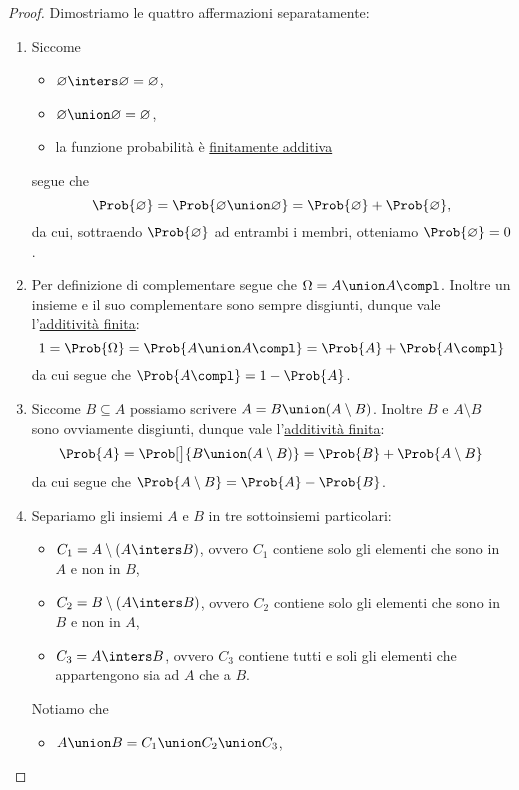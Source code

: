 \begin{proof}
    Dimostriamo le quattro affermazioni separatamente: \begin{enumerate}
        \item Siccome \begin{itemize}
            \item $\varnothing \inters \varnothing = \varnothing$,
            \item $\varnothing \union \varnothing = \varnothing$,
            \item la funzione probabilità è \hyperref[def:prob_finit_add]{finitamente additiva}
        \end{itemize} segue che \[
            \Prob{\varnothing} = \Prob{\varnothing \union \varnothing} = \Prob{\varnothing} + \Prob{\varnothing}, 
        \] da cui, sottraendo $\Prob{\varnothing}$ ad entrambi i membri, otteniamo $\Prob{\varnothing} = 0$.
        \item Per definizione di complementare segue che $\Omega = A \union A\compl$. Inoltre un insieme e il suo complementare sono sempre disgiunti, dunque vale l'\hyperref[def:prob_finit_add]{additività finita}: \[
            1 = \Prob{\Omega} = \Prob{A \union A\compl} = \Prob{A} + \Prob{A\compl}    
        \] da cui segue che $\Prob{A\compl} = 1 - \Prob{A}$.
        \item Siccome $B \subseteq A$ possiamo scrivere $A = B \union (A \setminus B)$. Inoltre $B$ e $A \setminus B$ sono ovviamente disgiunti, dunque vale l'\hyperref[def:prob_finit_add]{additività finita}: \[
            \Prob{A} = \Prob[\big]{B \union (A \setminus B)} = \Prob{B} + \Prob{A \setminus B}   
        \] da cui segue che $\Prob{A \setminus B} = \Prob{A} - \Prob{B}$.
        \item Separiamo gli insiemi $A$ e $B$ in tre sottoinsiemi particolari: \begin{itemize}
            \item $C_1 = A \setminus (A \inters B)$, ovvero $C_1$ contiene solo gli elementi che sono in $A$ e non in $B$,
            \item $C_2 = B \setminus (A \inters B)$, ovvero $C_2$ contiene solo gli elementi che sono in $B$ e non in $A$,
            \item $C_3 = A \inters B$, ovvero $C_3$ contiene tutti e soli gli elementi che appartengono sia ad $A$ che a $B$.
        \end{itemize}
        Notiamo che \begin{itemize}
            \item $A \union B = C_1 \union C_2 \union C_3$,

\end{itemize}
\end{enumerate}
\end{proof}
